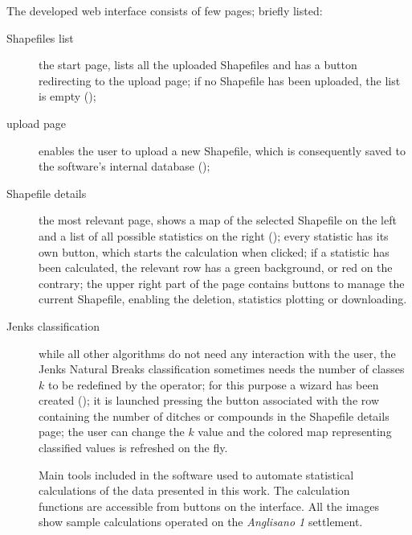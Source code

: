             The developed web interface consists of few pages; briefly listed:

            \begin{description}
                \item[Shapefiles list] the start page, lists all the uploaded Shapefiles and has a button redirecting to the upload page; if no Shapefile has been uploaded, the list is empty ();
                \item[upload page] enables the user to upload a new Shapefile, which is consequently saved to the software's internal database ();
                \item[Shapefile details] the most relevant page, shows a map of the selected Shapefile on the left and a list of all possible statistics on the right (); every statistic has its own button, which starts the calculation when clicked; if a statistic has been calculated, the relevant row has a green background, or red on the contrary; the upper right part of the page contains buttons to manage the current Shapefile, enabling the deletion, statistics plotting or downloading.
                \item[Jenks classification] while all other algorithms do not need any interaction with the user, the Jenks Natural Breaks classification sometimes needs the number of classes $k$ to be redefined by the operator; for this purpose a wizard has been created (); it is launched pressing the button associated with the row containing the number of ditches or compounds in the Shapefile details page; the user can change the $k$ value and the colored map representing classified values is refreshed on the fly.
            \end{description}

            \pagebreak

            \vfill

            \begin{figure}[H]
                \caption[Screenshots of the main tools of the software created to automate statistical calculations.]{Main tools included in the software used to automate statistical calculations of the data presented in this work. The calculation functions are accessible from buttons on the interface. All the images show sample calculations operated on the \emph{Anglisano 1} settlement.}
                \label{fig:screenshots}
            \end{figure}


